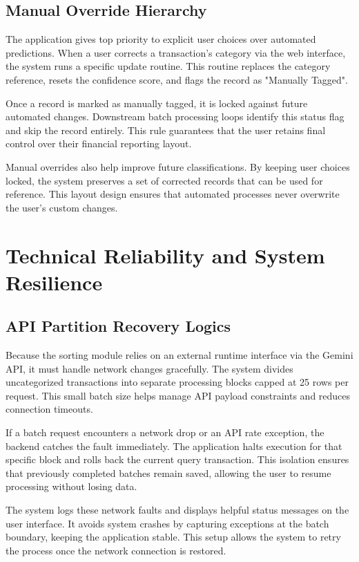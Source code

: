 \subsection{Manual Override Hierarchy}
The application gives top priority to explicit user choices over automated predictions. When a user corrects a transaction's category via the web interface, the system runs a specific update routine. This routine replaces the category reference, resets the confidence score, and flags the record as "Manually Tagged".

Once a record is marked as manually tagged, it is locked against future automated changes. Downstream batch processing loops identify this status flag and skip the record entirely. This rule guarantees that the user retains final control over their financial reporting layout.

Manual overrides also help improve future classifications. By keeping user choices locked, the system preserves a set of corrected records that can be used for reference. This layout design ensures that automated processes never overwrite the user's custom changes.

\section{Technical Reliability and System Resilience}

\subsection{API Partition Recovery Logics}
Because the sorting module relies on an external runtime interface via the Gemini API, it must handle network changes gracefully. The system divides uncategorized transactions into separate processing blocks capped at 25 rows per request. This small batch size helps manage API payload constraints and reduces connection timeouts.

If a batch request encounters a network drop or an API rate exception, the backend catches the fault immediately. The application halts execution for that specific block and rolls back the current query transaction. This isolation ensures that previously completed batches remain saved, allowing the user to resume processing without losing data.

The system logs these network faults and displays helpful status messages on the user interface. It avoids system crashes by capturing exceptions at the batch boundary, keeping the application stable. This setup allows the system to retry the process once the network connection is restored.

